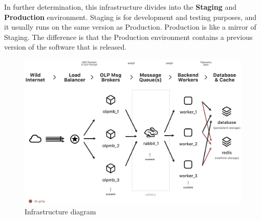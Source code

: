 In further determination, this infrastructure divides into the \textbf{Staging} and \textbf{Production} environment.
Staging is for development and testing purposes, and it usually runs on the same version as Production.
Production is like a mirror of Staging.
The difference is that the Production environment contains a previous version of the software that is released.









\begin{figure}
    \centering
    \includegraphics[scale=0.29, angle=90]{assets/infrastructure-diagram.png}
    \caption{Infrastructure diagram\cite{dataInfrastructure}}
    \label{fig:infrastracture-diagram}
\end{figure}
